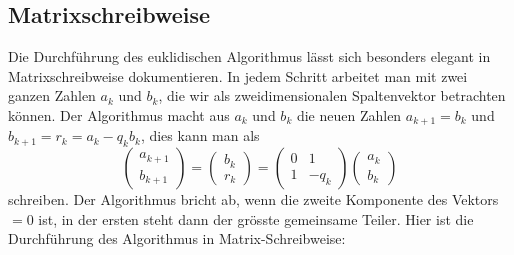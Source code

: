 %
%
\subsection{Matrixschreibweise
\label{buch:endlichekoerper:subsection:matrixschreibweise}}
Die Durchführung des euklidischen Algorithmus lässt sich besonders elegant
in Matrixschreibweise dokumentieren.
In jedem Schritt arbeitet man mit zwei ganzen Zahlen $a_k$ und $b_k$, die wir
als zweidimensionalen Spaltenvektor betrachten können.
Der Algorithmus macht aus $a_k$ und $b_k$ die neuen Zahlen
$a_{k+1} = b_k$ und $b_{k+1} = r_k = a_k - q_kb_k$, dies
kann man als
\[
\begin{pmatrix} a_{k+1} \\ b_{k+1} \end{pmatrix}
=
\begin{pmatrix} b_k \\ r_k \end{pmatrix}
=
\begin{pmatrix} 0 & 1 \\ 1 & -q_k \end{pmatrix}
\begin{pmatrix} a_{k} \\ b_{k} \end{pmatrix}
\]
schreiben.
Der Algorithmus bricht ab, wenn die zweite Komponente des Vektors $=0$ ist,
in der ersten steht dann der grösste gemeinsame Teiler.
Hier ist die Durchführung des Algorithmus in Matrix-Schreibweise:
